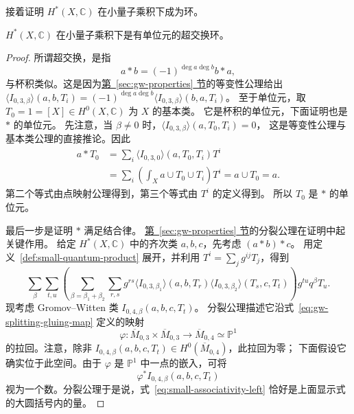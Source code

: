 接着证明 $H^*(X,\mathbb C)$ 在小量子乘积下成为环。
\begin{theorem}\label{thm:small-quantum-ring}
$H^*(X,\mathbb C)$ 在小量子乘积下是有单位元的超交换环。
\end{theorem}
\begin{proof}
所谓超交换，是指
\[
a*b=(-1)^{\deg a\deg b}b*a,
\]
与杯积类似。这是因为\hyperref[sec:gw-properties]{第~\ref*{sec:gw-properties} 节}的等变性公理给出
$\langle I_{0,3,\beta}\rangle(a,b,T_i)=(-1)^{\deg a\deg b}\langle I_{0,3,\beta}\rangle(b,a,T_i)$。
至于单位元，取 $T_0=1=[X]\in H^0(X,\mathbb C)$ 为 $X$ 的基本类。
它是杯积的单位元，下面证明也是 $*$ 的单位元。
先注意，当 $\beta\ne0$ 时，$\langle I_{0,3,\beta}\rangle(a,T_0,T_i)=0$，
这是等变性公理与基本类公理的直接推论。因此
\[
\begin{aligned}
a*T_0&=\sum_i\langle I_{0,3,0}\rangle(a,T_0,T_i)T^i\\
&=\sum_i\left(\int_Xa\cup T_0\cup T_i\right)T^i=a\cup T_0=a.
\end{aligned}
\]
第二个等式由点映射公理得到，第三个等式由 $T^i$ 的定义得到。
所以 $T_0$ 是 $*$ 的单位元。

最后一步是证明 $*$ 满足结合律。
\hyperref[sec:gw-properties]{第~\ref*{sec:gw-properties} 节}的分裂公理在证明中起关键作用。
给定 $H^*(X,\mathbb C)$ 中的齐次类 $a,b,c$，先考虑 $(a*b)*c$。
用定义~\ref{def:small-quantum-product} 展开，并利用
$T^i=\sum_jg^{ij}T_j$，得到
\[
\sum_\beta\sum_{t,u}\left(\sum_{\beta=\beta_1+\beta_2}\sum_{r,s}
g^{rs}\langle I_{0,3,\beta_1}\rangle(a,b,T_r)
\langle I_{0,3,\beta_2}\rangle(T_s,c,T_t)\right)g^{tu}q^\beta T_u.
\]
现考虑 Gromov--Witten 类 $I_{0,4,\beta}(a,b,c,T_t)$。
分裂公理描述它沿式~\eqref{eq:gw-splitting-gluing-map} 定义的映射
\[
\varphi:\overline M_{0,3}\times\overline M_{0,3}\longrightarrow\overline M_{0,4}\simeq\mathbb P^1
\]
的拉回。注意，除非 $I_{0,4,\beta}(a,b,c,T_t)\in H^0(\overline M_{0,4})$，此拉回为零；
下面假设它确实位于此空间。由于 $\varphi$ 是 $\mathbb P^1$ 中一点的嵌入，可将
\begin{equation}\label{eq:small-associativity-left}
\varphi^*I_{0,4,\beta}(a,b,c,T_t)
\end{equation}
视为一个数。分裂公理于是说，式~\eqref{eq:small-associativity-left}
恰好是上面显示式的大圆括号内的量。


\end{proof}
